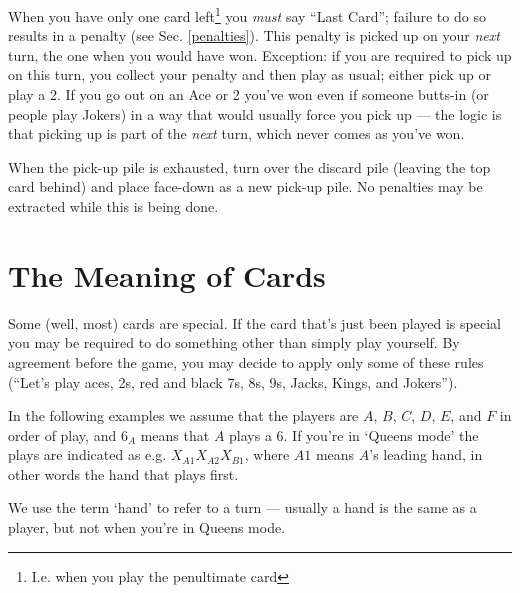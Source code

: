 \documentclass[12pt]{article}
\newcommand{\Sec}[1]{Sec. \ref{#1}}
\begin{document}
When you have only one card left\footnote{I.e. when you play the penultimate card} you \emph{must} say ``Last
Card''; failure to do so results in a penalty (see \Sec{penalties}).  This penalty is picked up on your
\textit{next} turn, the one when you would have won. Exception: if you are required to pick up on this turn,
you collect your penalty and then play as usual; either pick up or play a 2.  If you go out on an Ace or 2
you've won even if someone butts-in (or people play Jokers) in a way that would usually force you pick up ---
the logic is that picking up is part of the \textit{next} turn, which never comes as you've won.

When the pick-up pile is exhausted, turn over the discard pile (leaving the top card behind) and
place face-down as a new pick-up pile.  No penalties may be extracted while this is being
done.

\section{The Meaning of Cards}
\label{specialCards}

Some (well, most) cards are special.  If the card that's just been played is special you may be required to
do something other than simply play yourself.  By agreement before the game, you may decide to apply only
some of these rules (``Let's play aces, 2s, red and black 7s, 8s, 9s, Jacks, Kings, and Jokers'').

In the following examples we assume that the players are $A$, $B$, $C$, $D$, $E$, and $F$ in order of play,
and $6_A$ means that $A$ plays a 6.  If you're in `Queens mode' the plays are indicated as e.g. $X_{A1} X_{A2} X_{B1}$,
where $A1$ means $A$'s leading hand, in other words the hand that plays first.

We use the term `hand' to refer to a turn --- usually a hand is the same as a player, but not when
you're in Queens mode.
\end{document}
